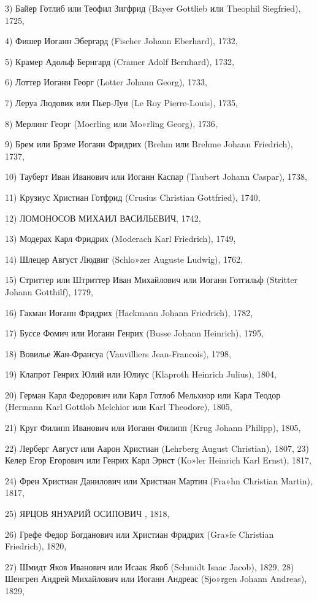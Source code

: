 \begin{itemize}
3) Байер Готлиб или Теофил Зигфрид (Bayer Gottlieb или Theophil Siegfried), 1725,

4) Фишер Иоганн Эбергард (Fischer Johann Eberhard), 1732,

5) Крамер Адольф Бернгард (Cramer Adolf Bernhard), 1732,

6) Лоттер Иоганн Георг (Lotter Johann Georg), 1733,

7) Леруа Людовик или Пьер-Луи (Le Roy Pierre-Louis), 1735,

8) Мерлинг Георг (Moerling или Mo»rling Georg), 1736,

9) Брем или Брэме Иоганн Фридрих (Brehm или Brehme Johann Friedrich), 1737,

10) Тауберт Иван Иванович или Иоганн Каспар (Taubert Johann Caspar), 1738,

11) Крузиус Христиан Готфрид (Crusius Christian Gottfried), 1740,

12) ЛОМОНОСОВ МИХАИЛ ВАСИЛЬЕВИЧ, 1742,

13) Модерах Карл Фридрих (Moderach Karl Friedrich), 1749,

14) Шлецер Август Людвиг (Schlo»zer Auguste Ludwig), 1762,

15) Стриттер или Штриттер Иван Михайлович или Иоганн Готгильф (Stritter Johann Gotthilf), 1779,

16) Гакман Иоганн Фридрих (Hackmann Johann Friedrich), 1782,

17) Буссе Фомич или Иоганн Генрих (Busse Johann Heinrich), 1795,

18) Вовилье Жан-Франсуа (Vauvilliers Jean-Francois), 1798,

19) Клапрот Генрих Юлий или Юлиус (Klaproth Heinrich Julius), 1804,

20) Герман Карл Федорович или Карл Готлоб Мельхиор или Карл Теодор (Hermann Karl Gottlob Melchior или Karl Theodore), 1805,

21) Круг Филипп Иванович или Иоганн Филипп (Krug Johann Philipp), 1805,

22) Лерберг Август или Аарон Христиан (Lehrberg August Christian), 1807, 23) Келер Егор Егорович или Генрих Карл Эрнст (Ko»ler Heinrich Karl Ernst), 1817,

24) Френ Христиан Данилович или Христиан Мартин (Fra»hn Christian Martin), 1817,

25) ЯРЦОВ ЯНУАРИЙ ОСИПОВИЧ , 1818,

26) Грефе Федор Богданович или Христиан Фридрих (Gra»fe Christian Friedrich), 1820,

27) Шмидт Яков Иванович или Исаак Якоб (Schmidt Isaac Jacob), 1829, 28) Шенгрен Андрей Михайлович или Иоганн Андреас (Sjo»rgen Johann Andreas), 1829,


\end{itemize}
